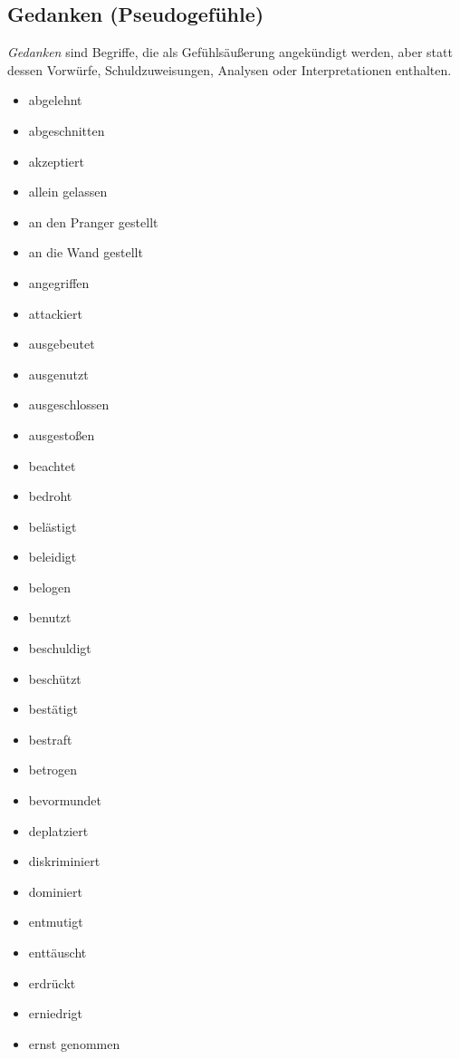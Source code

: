 \subsection{Gedanken (\glqq Pseudogefühle\grqq)}
\label{pseudogefuehle}

\emph{Gedanken} sind Begriffe, die als Gefühlsäußerung angekündigt werden, aber statt dessen Vorwürfe, Schuldzuweisungen, Analysen oder Interpretationen enthalten.

\begin{multicols}{2}
  \begin{itemize}
    \item abgelehnt
    \item abgeschnitten
    \item akzeptiert
    \item allein gelassen
    \item an den Pranger gestellt
    \item an die Wand gestellt
    \item angegriffen
    \item attackiert
    \item ausgebeutet
    \item ausgenutzt
    \item ausgeschlossen
    \item ausgestoßen
    \item beachtet
    \item bedroht
    \item belästigt
    \item beleidigt
    \item belogen
    \item benutzt
    \item beschuldigt
    \item beschützt
    \item bestätigt
    \item bestraft
    \item betrogen
    \item bevormundet
    \item deplatziert
    \item diskriminiert
    \item dominiert
    \item entmutigt
    \item enttäuscht
    \item erdrückt
    \item erniedrigt
    \item ernst genommen

\end{itemize}
\end{multicols}

